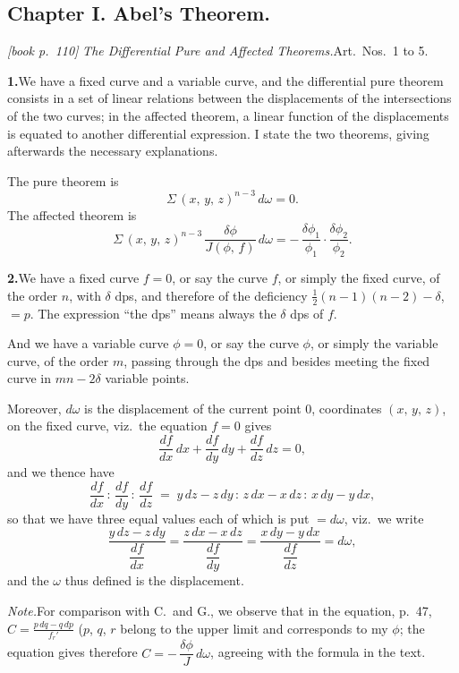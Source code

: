 \documentclass[11pt,a4paper]{article}
\theoremstyle{plain}
\theoremstyle{definition}
\theoremstyle{remark}
\begin{document}
\subsection*{Chapter I. Abel's Theorem.}

\noindent\textit{[book p.~110]} \textit{The Differential Pure and Affected Theorems.}\quad Art.\ Nos.\ 1 to 5.

\medskip\noindent\textbf{1.}\quad We have a fixed curve and a variable curve, and the differential pure theorem consists in a set of linear relations between the displacements of the intersections of the two curves; in the affected theorem, a linear function of the displacements is equated to another differential expression. I state the two theorems, giving afterwards the necessary explanations.

The pure theorem is
\[
\Sigma\,(x,\,y,\,z)^{n-3}\,d\omega = 0.
\]
The affected theorem is
\[
\Sigma\,(x,\,y,\,z)^{n-3}\,\frac{\delta\phi}{J(\phi,\,f)}\,d\omega = -\,\frac{\delta\phi_1}{\phi_1}\cdot\frac{\delta\phi_2}{\phi_2}.
\]

\medskip\noindent\textbf{2.}\quad We have a fixed curve $f = 0$, or say the curve $f$, or simply the fixed curve, of the order $n$, with $\delta$ dps, and therefore of the deficiency $\tfrac{1}{2}(n - 1)(n - 2) - \delta$, $= p$. The expression ``the dps'' means always the $\delta$ dps of $f$.

And we have a variable curve $\phi = 0$, or say the curve $\phi$, or simply the variable curve, of the order $m$, passing through the dps and besides meeting the fixed curve in $mn - 2\delta$ variable points.

Moreover, $d\omega$ is the displacement of the current point $0$, coordinates $(x,\,y,\,z)$, on the fixed curve, viz.\ the equation $f = 0$ gives
\[
\frac{df}{dx}\,dx + \frac{df}{dy}\,dy + \frac{df}{dz}\,dz = 0,
\]
and we thence have
\[
\frac{df}{dx}\,:\,\frac{df}{dy}\,:\,\frac{df}{dz}\;=\;y\,dz - z\,dy\,:\,z\,dx - x\,dz\,:\,x\,dy - y\,dx,
\]
so that we have three equal values each of which is put $= d\omega$, viz.\ we write
\[
\frac{y\,dz - z\,dy}{\dfrac{df}{dx}} = \frac{z\,dx - x\,dz}{\dfrac{df}{dy}} = \frac{x\,dy - y\,dx}{\dfrac{df}{dz}} = d\omega,
\]
and the $\omega$ thus defined is the displacement.

\medskip\noindent\textit{Note.}\quad For comparison with C.\ and G., we observe that in the equation, p.~47, $C = \frac{p\,dq - q\,dp}{f_r'}$ ($p$, $q$, $r$ belong to the upper limit and corresponds to my $\phi$; the equation gives therefore $C = -\,\dfrac{\delta\phi}{J}\,d\omega$, agreeing with the formula in the text.
\end{document}

